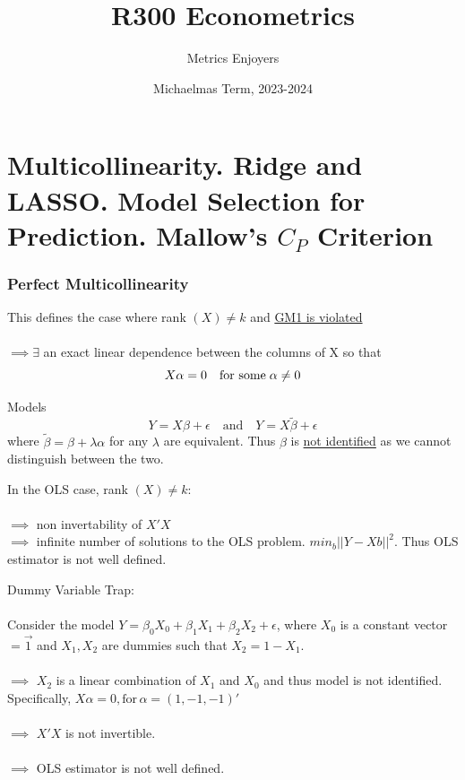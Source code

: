 \documentclass[DIV=14,titlepage=false]{scrreprt}
\title{%
R300 Econometrics}
\author{Metrics Enjoyers}
\date{Michaelmas Term, 2023-2024}
\begin{document}
\chapter{Multicollinearity. Ridge and LASSO. Model Selection for Prediction. Mallow's \(C_P\) Criterion}

\subsection{Perfect Multicollinearity}

\begin{definition}
    This defines the case where rank \((X) \neq k\) and \underline{GM1 is violated}
    \\ \\
    \(\implies \exists\) an exact linear dependence between the columns of X so that
    \[X\alpha=0 \quad \text{for some} \hspace{1mm} \alpha \neq 0\] 
\end{definition}

\vspace{5mm}

\begin{corollary}
    Models \[Y=X\beta+\epsilon \quad \text{and} \quad Y=X\tilde{\beta}+\epsilon\]
    where \(\tilde{\beta}=\beta+\lambda\alpha\) for any \(\lambda\) are equivalent. Thus \(\beta\) is \underline{not identified} as we cannot distinguish between the two.
\end{corollary}

\begin{corollary} In the OLS case, 
    rank \((X) \neq k\): \\ \\ \(\implies\) non invertability of \(X'X\) \\ \(\implies\) infinite number of solutions to the OLS problem. \(min_{b}||Y-Xb||^2\). Thus OLS estimator is not well defined.
\end{corollary}

\vspace{5mm}
\begin{example}
    Dummy Variable Trap: \\ \\
    Consider the model \(Y=\beta_0X_0+\beta_1X_1+\beta_2X_2+\epsilon\), where \(X_0\) is a constant vector \(=\vec{1}\) and \(X_1, X_2\) are dummies such that \(X_2=1-X_1\). \\ \\
    \(\implies\) \(X_2\) is a linear combination of \(X_1\) and \(X_0\) and thus model is not identified. Specifically, \(X\alpha=0, \text{for} \, \alpha = (1, -1, -1)'\) \\ \\
    \(\implies\) \(X'X\) is not invertible. \\ \\
    \(\implies\) OLS estimator is not well defined.
\end{example}
\end{document}
